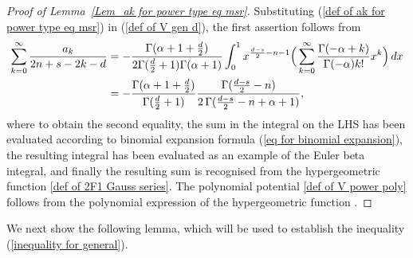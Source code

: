 \documentclass[10pt]{amsart}
\theoremstyle{plain}
\theoremstyle{remark}
\numberwithin{equation}{section}
\begin{document}
\begin{proof}[Proof of Lemma~\ref{Lem_ak for power type eq msr}]
Substituting (\ref{def of ak for power type eq msr}) in (\ref{def of V gen d}),
the first assertion follows from 
\begin{align}
\begin{split}
\label{ak sum v1}
\sum_{k=0}^\infty \frac{ a_k}{ 2n+s-2k-d } &= - \frac{ \Gamma(\alpha+1+\frac{d}{2}) }{  2 \Gamma(\frac{d}{2}+1) \Gamma(\alpha+1)}
\int_0^1 x^{ \frac{d-s}{2}-n -1} \Big ( \sum_{k=0}^\infty {\Gamma(-\alpha + k) \over\Gamma(-\alpha) k!} x^k \Big ) \, dx
\\
&= -  \frac{ \Gamma(\alpha+1+\frac{d}{2}) }{  \Gamma(\frac{d}{2}+1) }  \frac{   \Gamma( \frac{d-s}{2}-n ) }{2 \, \Gamma( \frac{d-s}{2}-n+\alpha+1  )}, 
\end{split}
\end{align}
where to obtain the second equality, the sum in the integral on the LHS has been evaluated according to binomial expansion formula (\ref{eq for binomial expansion}), the resulting integral has been evaluated as an example of the Euler beta integral, and finally the resulting sum is recognised from the hypergeometric function \eqref{def of 2F1 Gauss series}.
The polynomial potential \eqref{def of V power poly} follows from the polynomial expression of the hypergeometric function \cite[Eq.(15.2.4)]{NIST}. 
\end{proof} 
    
















 

We next show the following lemma, which will be used to establish the inequality (\ref{inequality for general}).
\end{document}
